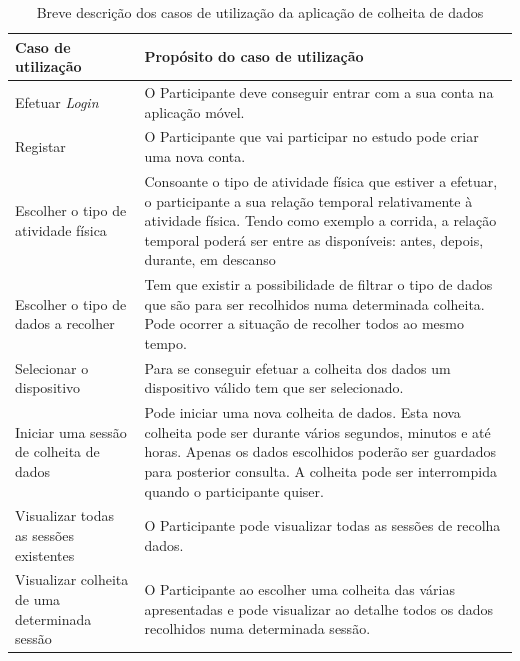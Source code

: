 \begin{table}[H]
\centering

\begin{tabularx}{1\textwidth}{|p{4cm}|p{10.7cm}|}
\rowcolor[HTML]{FFCE93} \hline
\textbf{Caso de utilização} &  \textbf{Propósito do caso de utilização}  \\
\hline
Efetuar \textit{Login}  & O Participante deve conseguir entrar com a sua conta na aplicação móvel. \\ \hline

Registar & O Participante que vai participar no estudo pode criar uma nova  conta. \\ \hline

Escolher o tipo de atividade física & Consoante o tipo de atividade física que estiver a efetuar, o participante a sua relação temporal relativamente à atividade física. Tendo como exemplo a corrida, a relação temporal poderá ser entre as disponíveis: antes, depois, durante, em descanso\\ \hline

Escolher o tipo de dados a recolher & Tem que existir a possibilidade de filtrar o tipo de dados que são para ser recolhidos numa determinada colheita. Pode ocorrer a situação de recolher todos ao mesmo tempo. \\ \hline

Selecionar o dispositivo  & Para se conseguir efetuar a colheita dos dados um dispositivo válido tem que ser selecionado. \\ \hline

Iniciar uma sessão de colheita de dados & Pode iniciar uma nova colheita de dados. Esta nova colheita pode ser durante vários segundos, minutos e até horas. Apenas os dados escolhidos poderão ser guardados para posterior consulta. A colheita pode ser interrompida quando o participante quiser. \\ \hline

Visualizar todas as sessões existentes & O Participante pode visualizar todas as sessões de recolha dados. \\ \hline

Visualizar colheita de uma determinada sessão & O Participante ao escolher uma colheita das várias apresentadas e pode visualizar ao detalhe todos os dados recolhidos numa determinada sessão. \\ \hline    

\end{tabularx}

\caption{Breve descrição dos casos de utilização da aplicação de colheita de dados}
\label{t:android-usecase}
\end{table}

